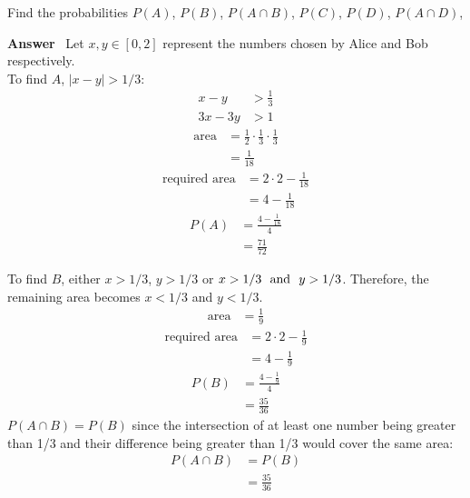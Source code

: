 \documentclass[paper=usletter, fontsize=12pt]{article}
\newcommand{\ans}{\textbf{Answer} \ }
\begin{document}
\begin{enumerate}
            Find the probabilities $P(A)$, $P(B)$, $P(A \cap B)$, $P(C)$,
            $P(D)$, $P(A \cap D)$,

            \ans Let $x, y \in [0, 2]$ represent the numbers chosen by
            Alice and Bob respectively. \\
            To find $A$, $|x - y| > 1/3$:
            \begin{align*}
                x - y & > \frac{1}{3} \\
                3x - 3y & > 1
            \end{align*}
            \begin{align*}
                \text{area} & = \frac{1}{2} \cdot \frac{1}{3} \cdot
                \frac{1}{3} \\
                & = \frac{1}{18}
            \end{align*}
            \begin{align*}
                \text{required area} & = 2 \cdot 2 - \frac{1}{18} \\
                & = 4 - \frac{1}{18}
            \end{align*}
            \begin{align*}
                P(A) & = \frac{4 - \frac{1}{18}}{4} \\
                & = \frac{71}{72}
            \end{align*}

            To find $B$, either $x > 1/3$, $y > 1/3$ or $x > 1/3 \text{ \ and \
            } y > 1/3$. Therefore, the remaining area becomes $x < 1/3$ and $y
            < 1/3$.
            \begin{align*}
                \text{area} & = \frac{1}{9}
            \end{align*}
            \begin{align*}
                \text{required area} & = 2 \cdot 2 - \frac{1}{9} \\
                & = 4 - \frac{1}{9}
            \end{align*}
            \begin{align*}
                P(B) & = \frac{4 - \frac{1}{9}}{4} \\
                & = \frac{35}{36}
            \end{align*}
            $P(A \cap B) = P(B)$ since the intersection of at least one number
            being greater than 1/3 and their difference being greater than 1/3
            would cover the same area:
            \begin{align*}
                P(A \cap B) & = P(B)  \\
                & = \frac{35}{36}
            \end{align*}


\end{enumerate}
\end{document}
